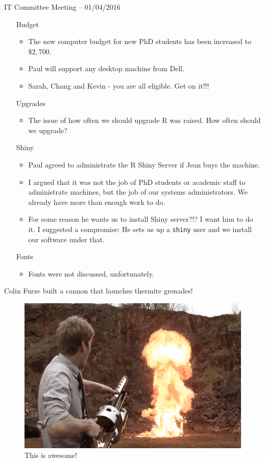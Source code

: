 \documentclass{beamer}
\begin{document}
\begin{frame}{IT Committee Meeting -- 01/04/2016}
\small
\begin{itemize}
\item[Budget] \begin{itemize}
\item The new computer budget for new PhD students has been increased to $\$2,700$.
\item Paul will support any desktop	machine from Dell.
\item Sarah, Chang and Kevin - you are all eligible. Get on it!!!
\end{itemize}
\item[Upgrades]
\begin{itemize}
\item The issue of how often we should upgrade R was raised. How often should we upgrade?
\end{itemize}
\item[Shiny] \begin{itemize}
\item Paul agreed to administrate the R Shiny Server if Jean buys the machine.
\item I argued that it was not the job of PhD students or academic staff to administrate machines, but the job 
			of our systems administrators. We already have more than enough work to do.
\item For some reason he wants us to install Shiny server?!? I want him to do it. I suggested a compromise:
			He sets us up a \texttt{shiny} user and we install our software under that.
\end{itemize}
\item[Fonts]
\begin{itemize}
\item Fonts were not discussed, unfortunately.
\end{itemize}
\end{itemize}
\end{frame}

\begin{frame}{Colin Furze built a cannon that launches thermite grenades!}
\begin{figure}
\caption{This is awesome!}
\includegraphics[scale=.5]{thermite1-720x720.png}
\end{figure}
\end{frame}
\end{document}
